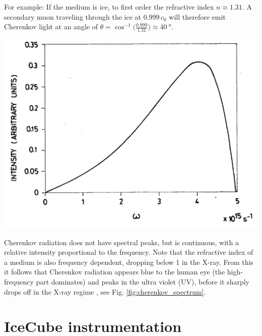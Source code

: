 \documentclass[
    a4paper, %
    fontsize=10pt, %
    twoside=true, %
    numbers=noenddot, %
    fontmethod=tex, %
]{kaobook}
\begin{document}
For example: If the medium is ice, to first order the refractive index $n\approx1.31$. A secondary muon traveling through the ice at $0.999\,c_0$ will therefore emit Cherenkov light at an angle of $\theta = \cos^{-1}{\big(\frac{0.999}{1.31}\big)} \approx \SI{40}{\degree}$. 
\begin{marginfigure}
    \includegraphics{ic_cherenkov_spectrum.png}
    \caption[Cherenkov spectrum]{Cherenkov spectrum for a particle with $v=0.8 \,c_0$ in water. The intensity peaks at $\SI{4e15}{\Hz}$, corresponding to a wavelength of \SI{75}{\nm}, lying at the high-frequency end of the UV spectrum. From \cite{Fulop1992}.}
\end{marginfigure}
Cherenkov radiation does not have spectral peaks, but is continuous, with a relative intensity proportional to the frequency. Note that the refractive index of a medium is also frequency dependent, dropping below 1 in the X-ray. From this it follows that Cherenkov radiation appears blue to the human eye (the high-frequency part dominates) and peaks in the ultra violet (UV), before it sharply drops off in the X-ray regime , see Fig. \ref{fig:cherenkov_spectrum}.

\section{IceCube instrumentation}
\end{document}
